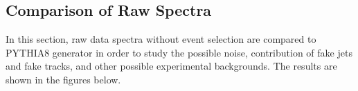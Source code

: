 \subsection{Comparison of Raw Spectra}

In this section, raw data spectra without event selection are compared to PYTHIA8 generator in order to study the possible noise, contribution of fake jets and fake tracks, and other possible experimental backgrounds. The results are shown in the figures below.


